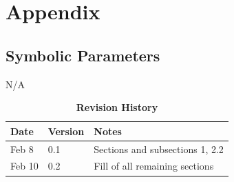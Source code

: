 \documentclass[12pt, titlepage]{article}
\begin{document}




\newpage

\section{Appendix}


\subsection{Symbolic Parameters}



N/A

\newpage

\begin{table}[hp]
\caption{\bf Revision History}
\begin{tabularx}{\textwidth}{p{3cm}p{2cm}X}
\toprule {\bf Date} & {\bf Version} & {\bf Notes}\\
\midrule
Feb 8 & 0.1 & Sections and subsections 1, 2.2\\
Feb 10 & 0.2 & Fill of all remaining sections\\
\bottomrule
\end{tabularx}
\end{table}
\end{document}
